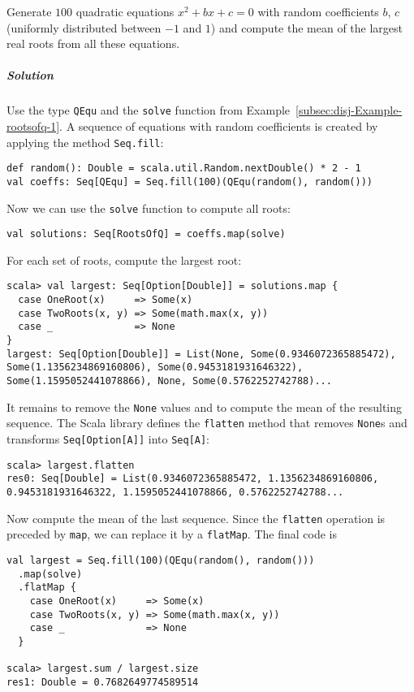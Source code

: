 Generate $100$ quadratic equations $x^{2}+bx+c=0$ with random coefficients
$b$, $c$ (uniformly distributed between $-1$ and $1$) and compute
the mean of the largest real roots from all these equations.

\subparagraph{Solution}

Use the type \lstinline!QEqu! and the \lstinline!solve! function
from Example~\ref{subsec:disj-Example-rootsofq-1}. A sequence of
equations with random coefficients is created by applying the method
\lstinline!Seq.fill!:
\begin{lstlisting}
def random(): Double = scala.util.Random.nextDouble() * 2 - 1
val coeffs: Seq[QEqu] = Seq.fill(100)(QEqu(random(), random()))
\end{lstlisting}
Now we can use the \lstinline!solve! function to compute all roots:
\begin{lstlisting}
val solutions: Seq[RootsOfQ] = coeffs.map(solve)
\end{lstlisting}
For each set of roots, compute the largest root:
\begin{lstlisting}
scala> val largest: Seq[Option[Double]] = solutions.map {
  case OneRoot(x)     => Some(x)
  case TwoRoots(x, y) => Some(math.max(x, y))
  case _              => None
}
largest: Seq[Option[Double]] = List(None, Some(0.9346072365885472), Some(1.1356234869160806), Some(0.9453181931646322), Some(1.1595052441078866), None, Some(0.5762252742788)...
\end{lstlisting}
It remains to remove the \lstinline!None! values and to compute the
mean of the resulting sequence. The Scala library defines the \lstinline!flatten!
method that removes \lstinline!None!s and transforms \lstinline!Seq[Option[A]]!
into \lstinline!Seq[A]!:
\begin{lstlisting}
scala> largest.flatten
res0: Seq[Double] = List(0.9346072365885472, 1.1356234869160806, 0.9453181931646322, 1.1595052441078866, 0.5762252742788...
\end{lstlisting}
Now compute the mean of the last sequence. Since the \lstinline!flatten!
operation is preceded by \lstinline!map!, we can replace it by a
\lstinline!flatMap!. The final code is
\begin{lstlisting}
val largest = Seq.fill(100)(QEqu(random(), random()))
  .map(solve)
  .flatMap {
    case OneRoot(x)     => Some(x)
    case TwoRoots(x, y) => Some(math.max(x, y))
    case _              => None
  }

scala> largest.sum / largest.size
res1: Double = 0.7682649774589514
\end{lstlisting}


